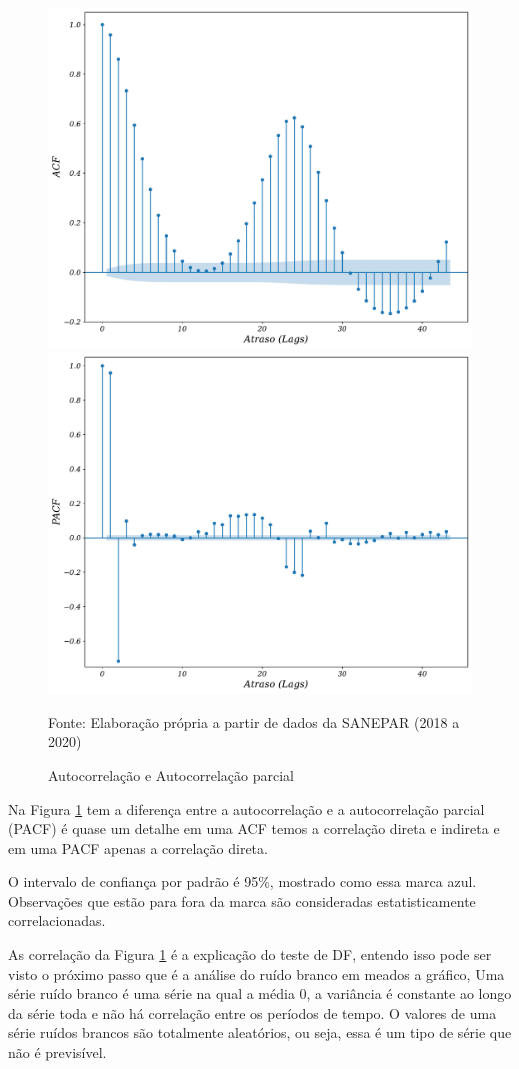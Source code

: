 \begin{figure}[H]
	\centering
		\caption{Autocorrelação e Autocorrelação parcial}
\begin{minipage}[c]{\textwidth}
	\label{fig:acf}
	\includegraphics[width=0.5\linewidth]{Resultados/Figuras/acf} \qquad
	\includegraphics[width=0.5\linewidth]{Resultados/Figuras/pacf}
\end{minipage}
	Fonte: Elaboração própria a partir de dados da SANEPAR (2018 a 2020)
\end{figure}

Na Figura \ref{fig:acf} tem a diferença entre a autocorrelação e a autocorrelação parcial (PACF) é quase um detalhe em uma ACF temos a correlação direta e indireta e em uma PACF apenas a correlação direta. 

O intervalo de confiança por padrão é 95\%, mostrado como essa marca azul. Observações que estão para fora da marca são consideradas estatisticamente correlacionadas.

As correlação da Figura \ref{fig:acf} é a explicação do teste de DF, entendo isso pode ser visto o próximo passo que é  a análise do ruído branco em meados a gráfico, Uma série ruído branco é uma série na qual a média 0, a variância é constante ao longo da série toda e não há correlação entre os períodos de tempo. O valores de uma série ruídos brancos são totalmente aleatórios, ou seja, essa é um tipo de série que não é previsível.

